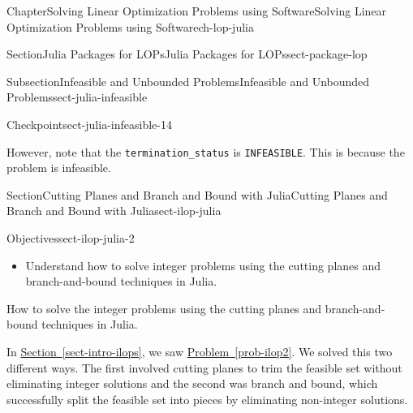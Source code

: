 \documentclass[oneside,10pt,]{book}
\newcommand{\xreffont}{\relax}
\newcommand{\mono}[1]{\texttt{#1}}
\numberwithin{equation}{section}
\begin{document}
\begin{chapterptx}{Chapter}{Solving Linear Optimization Problems using Software}{}{Solving Linear Optimization Problems using Software}{}{}{ch-lop-julia}
\begin{sectionptx}{Section}{Julia Packages for LOPs}{}{Julia Packages for LOPs}{}{}{sect-package-lop}
\begin{subsectionptx}{Subsection}{Infeasible and Unbounded Problems}{}{Infeasible and Unbounded Problems}{}{}{sect-julia-infeasible}
\begin{inlineexercise}{Checkpoint}{}{sect-julia-infeasible-14}
%
\par
However, note that the \mono{termination\_status} is \mono{INFEASIBLE}.  This is because the problem is infeasible.%
\end{inlineexercise}%
\end{subsectionptx}
\end{sectionptx}
%
%
\typeout{************************************************}
\typeout{************************************************}
%
\begin{sectionptx}{Section}{Cutting Planes and Branch and Bound with Julia}{}{Cutting Planes and Branch and Bound with Julia}{}{}{sect-ilop-julia}
\begin{objectives}{Objectives}{sect-ilop-julia-2}
%
\begin{itemize}[label=\textbullet]
\item{}Understand how to solve integer problems using the cutting planes and branch-and-bound techniques in Julia.%
\end{itemize}
\end{objectives}
\begin{introduction}{}%
How to solve the integer problems using the cutting planes and branch-and-bound techniques in Julia.%
\par
In \hyperref[sect-intro-ilops]{Section~{\xreffont\ref{sect-intro-ilops}}}, we saw \hyperref[prob-ilop2]{Problem~{\xreffont\ref{prob-ilop2}}}. We solved this two different ways. The first involved cutting planes to trim the feasible set without eliminating integer solutions and the second was branch and bound, which successfully split the feasible set into pieces by eliminating non-integer solutions.%

\end{introduction}
\end{sectionptx}
\end{chapterptx}
\end{document}
